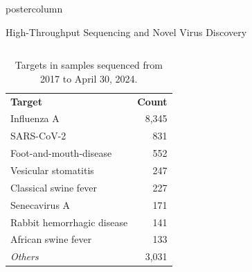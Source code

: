 \documentclass[final]{beamer}
\begin{document}
\begin{frame}
\begin{columns}
\begin{column}{.5\textwidth}
\begin{beamercolorbox}[center,wd=\textwidth]{postercolumn}
\begin{minipage}[T]{.95\textwidth}
{  %
  \begin{block}{High-Throughput Sequencing and Novel Virus Discovery}
    \begin{columns}
    \begin{column}{.26\textwidth}
      \parbox[t]{\textwidth}{
      \begin{table}
      \caption{Targets in samples sequenced from 2017 to April 30, 2024.}
      \begin{tabular}{l r}
      \textbf{Target} & \textbf{Count} \\
      Influenza A & 8,345 \\
      SARS-CoV-2 & 831 \\
      Foot-and-mouth-disease & 552 \\
      Vesicular stomatitis & 247 \\
      Classical swine fever & 227 \\
      Senecavirus A & 171 \\
      Rabbit hemorrhagic disease & 141 \\
      African swine fever & 133 \\
      \emph{Others} & 3,031 \\
      \end{tabular}
      

\end{table}}
\end{column}
\end{columns}
\end{block}}
\end{minipage}
\end{beamercolorbox}
\end{column}
\end{columns}
\end{frame}
\end{document}
